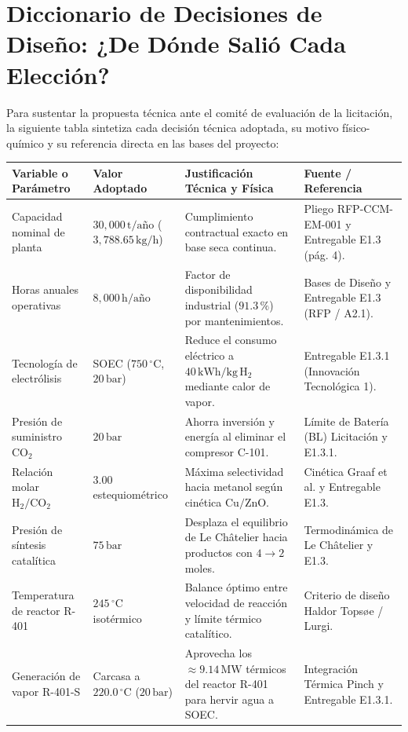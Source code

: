 \documentclass[11pt,a4paper]{article}
\begin{document}
\section{Diccionario de Decisiones de Diseño: ¿De Dónde Salió Cada Elección?}

Para sustentar la propuesta técnica ante el comité de evaluación de la licitación, la siguiente tabla sintetiza cada decisión técnica adoptada, su motivo físico-químico y su referencia directa en las bases del proyecto:

\begin{longtable}{p{3.8cm} p{3.2cm} p{4.2cm} p{3.8cm}}
\toprule
\textbf{Variable o Parámetro} & \textbf{Valor Adoptado} & \textbf{Justificación Técnica y Física} & \textbf{Fuente / Referencia} \\
\midrule
\endhead
Capacidad nominal de planta & $30{,}000\,\text{t/año}$ ($3{,}788.65\,\text{kg/h}$) & Cumplimiento contractual exacto en base seca continua. & Pliego RFP-CCM-EM-001 y Entregable E1.3 (pág. 4). \\
Horas anuales operativas & $8{,}000\,\text{h/año}$ & Factor de disponibilidad industrial ($91.3\,\%$) por mantenimientos. & Bases de Diseño y Entregable E1.3 (RFP / A2.1). \\
Tecnología de electrólisis & SOEC ($750\,^\circ\text{C}$, $20\,\text{bar}$) & Reduce el consumo eléctrico a $40\,\text{kWh/kg}\,\text{H}_2$ mediante calor de vapor. & Entregable E1.3.1 (Innovación Tecnológica 1). \\
Presión de suministro $\text{CO}_2$ & $20\,\text{bar}$ & Ahorra inversión y energía al eliminar el compresor C-101. & Límite de Batería (BL) Licitación y E1.3.1. \\
Relación molar $\text{H}_2/\text{CO}_2$ & $3.00$ estequiométrico & Máxima selectividad hacia metanol según cinética $\text{Cu/ZnO}$. & Cinética Graaf et al. y Entregable E1.3. \\
Presión de síntesis catalítica & $75\,\text{bar}$ & Desplaza el equilibrio de Le Châtelier hacia productos con $4 \to 2$ moles. & Termodinámica de Le Châtelier y E1.3. \\
Temperatura de reactor R-401 & $245\,^\circ\text{C}$ isotérmico & Balance óptimo entre velocidad de reacción y límite térmico catalítico. & Criterio de diseño Haldor Topsøe / Lurgi. \\
Generación de vapor R-401-S & Carcasa a $220.0\,^\circ\text{C}$ ($20\,\text{bar}$) & Aprovecha los $\approx 9.14\,\text{MW}$ térmicos del reactor R-401 para hervir agua a SOEC. & Integración Térmica Pinch y Entregable E1.3.1. \\

\end{longtable}
\end{document}
